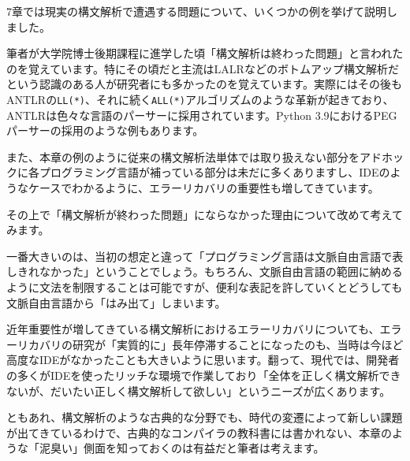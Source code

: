 7章では現実の構文解析で遭遇する問題について、いくつかの例を挙げて説明しました。

筆者が大学院博士後期課程に進学した頃「構文解析は終わった問題」と言われたのを覚えています。特にその頃だと主流はLALRなどのボトムアップ構文解析だという認識のある人が研究者にも多かったのを覚えています。実際にはその後もANTLRの\texttt{LL(*)}、それに続く\texttt{ALL(*)}アルゴリズムのような革新が起きており、ANTLRは色々な言語のパーサーに採用されています。Python 3.9におけるPEGパーサーの採用のような例もあります。

また、本章の例のように従来の構文解析法単体では取り扱えない部分をアドホックに各プログラミング言語が補っている部分は未だに多くありますし、IDEのようなケースでわかるように、エラーリカバリの重要性も増してきています。

その上で「構文解析が終わった問題」にならなかった理由について改めて考えてみます。

一番大きいのは、当初の想定と違って「プログラミング言語は文脈自由言語で表しきれなかった」ということでしょう。もちろん、文脈自由言語の範囲に納めるように文法を制限することは可能ですが、便利な表記を許していくとどうしても文脈自由言語から「はみ出て」しまいます。

近年重要性が増してきている構文解析におけるエラーリカバリについても、エラーリカバリの研究が「実質的に」長年停滞することになったのも、当時は今ほど高度なIDEがなかったことも大きいように思います。翻って、現代では、開発者の多くがIDEを使ったリッチな環境で作業しており「全体を正しく構文解析できないが、だいたい正しく構文解析して欲しい」というニーズが広くあります。

ともあれ、構文解析のような古典的な分野でも、時代の変遷によって新しい課題が出てきているわけで、古典的なコンパイラの教科書には書かれない、本章のような「泥臭い」側面を知っておくのは有益だと筆者は考えます。
